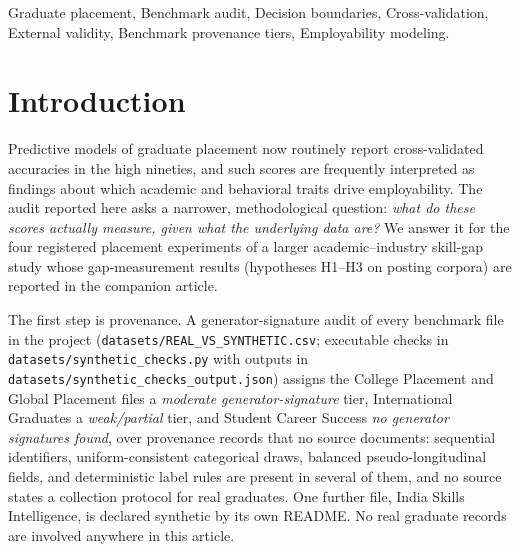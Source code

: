 \documentclass[journal]{IEEEtran}
\begin{document}
\begin{IEEEkeywords}
Graduate placement, Benchmark audit, Decision boundaries, Cross-validation, External validity, Benchmark provenance tiers, Employability modeling.
\end{IEEEkeywords}

\section{Introduction}
\label{sec:intro_p}

Predictive models of graduate placement now routinely report cross-validated accuracies in the high nineties, and such scores are frequently interpreted as findings about which academic and behavioral traits drive employability. The audit reported here asks a narrower, methodological question: \textit{what do these scores actually measure, given what the underlying data are?} We answer it for the four registered placement experiments of a larger academic--industry skill-gap study whose gap-measurement results (hypotheses H1--H3 on posting corpora) are reported in the companion article.

The first step is provenance. A generator-signature audit of every benchmark file in the project (\texttt{datasets/REAL\_VS\_SYNTHETIC.csv}; executable checks in \texttt{datasets/synthetic\_checks.py} with outputs in \texttt{datasets/synthetic\_checks\_output.json}) assigns the College Placement and Global Placement files a \textit{moderate generator-signature} tier, International Graduates a \textit{weak/partial} tier, and Student Career Success \textit{no generator signatures found}, over provenance records that no source documents: sequential identifiers, uniform-consistent categorical draws, balanced pseudo-longitudinal fields, and deterministic label rules are present in several of them, and no source states a collection protocol for real graduates. One further file, India Skills Intelligence, is declared synthetic by its own README. No real graduate records are involved anywhere in this article.
\end{document}
